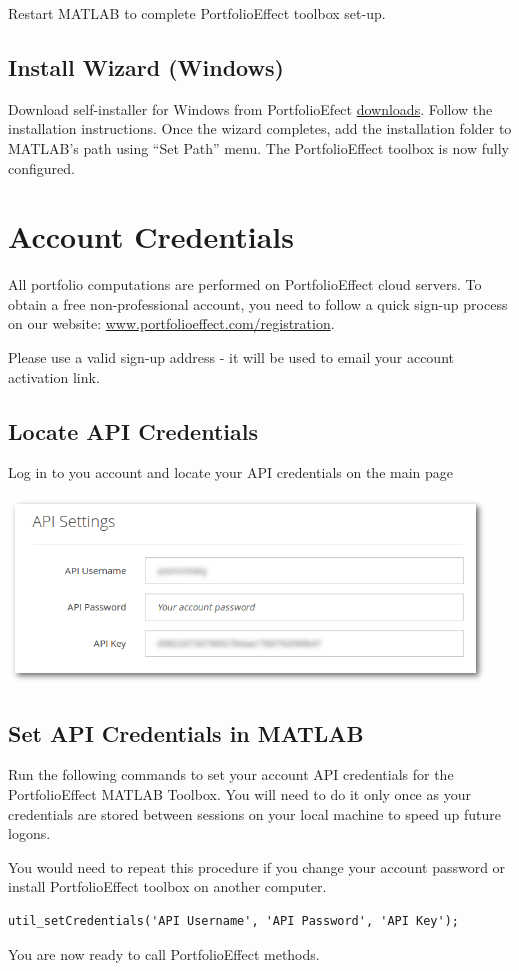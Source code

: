 \documentclass[letterpaper]{report}
\begin{document}
Restart MATLAB to complete PortfolioEffect toolbox set-up.

\section{Install Wizard (Windows)}
Download self-installer for Windows from PortfolioEfect
\href{https://www.portfolioeffect.com/docs/platform/quant/downloads}{downloads}.
Follow the installation instructions. Once the wizard completes, add the
installation folder to MATLAB's path using ``Set Path'' menu. 
The PortfolioEffect toolbox is now fully configured.

\chapter{Account Credentials}
All portfolio computations are performed on PortfolioEffect cloud servers.
To obtain a free non-professional account, you need to follow a quick sign-up
process on our website:
\href{https://www.portfolioeffect.com/registration}{www.portfolioeffect.com/registration}.\par
Please use a valid sign-up address - it will be used to email your
account activation link.

\section{Locate API Credentials} 
Log in to you account and locate your API credentials on the main page

\includegraphics[width=5in]{img/api-settings.png}
 
\section{Set API Credentials in MATLAB} 
Run the following commands to set your account API credentials for the
PortfolioEffect MATLAB Toolbox.
You will need to do it only once as your credentials are stored between sessions
on your local machine to speed up future logons. \par You would need to repeat
this procedure if you change your account password or install PortfolioEffect
toolbox on another computer.
\begin{lstlisting}
util_setCredentials('API Username', 'API Password', 'API Key');
\end{lstlisting}
You are now ready to call PortfolioEffect methods.
\end{document}
